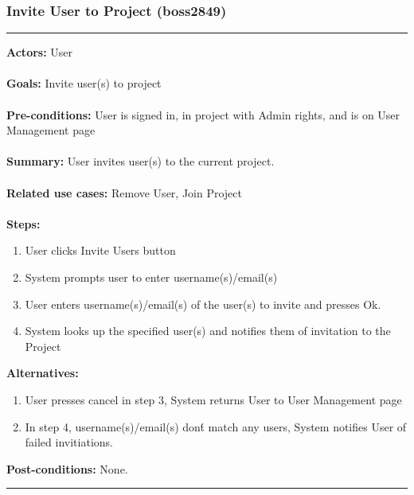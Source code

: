 \documentclass[11pt]{report}
\begin{document}
\subsubsection{Invite User to Project  (boss2849)}
\vspace{2pt}
\hrule
\vspace{8pt}
 \textbf{Actors:} User \\ \\
\textbf{Goals:} Invite user(s) to project \\ \\
 \textbf{Pre-conditions:} User is signed in, in project with Admin rights, and is on User Management page \\ \\
 \textbf{Summary:} User invites user(s) to the current project. \\ \\
\textbf{Related use cases:} Remove User, Join Project \\ \\
\textbf{Steps:} \begin{enumerate}
  \item User clicks Invite Users button
  \item System prompts user to enter username(s)/email(s)
  \item User enters username(s)/email(s) of the user(s) to invite and presses Ok.
  \item System looks up the specified user(s) and notifies them of invitation to the Project
 \end{enumerate}
 \textbf{Alternatives:} \begin{enumerate}
  \item User presses cancel in step 3, System returns User to User Management page
  \item In step 4, username(s)/email(s) don\'t match any users, System notifies User of failed invitiations.
 \end{enumerate} 
 \textbf{Post-conditions:} None. \\
\vspace{8pt}
\hrule
\newpage
\end{document}
